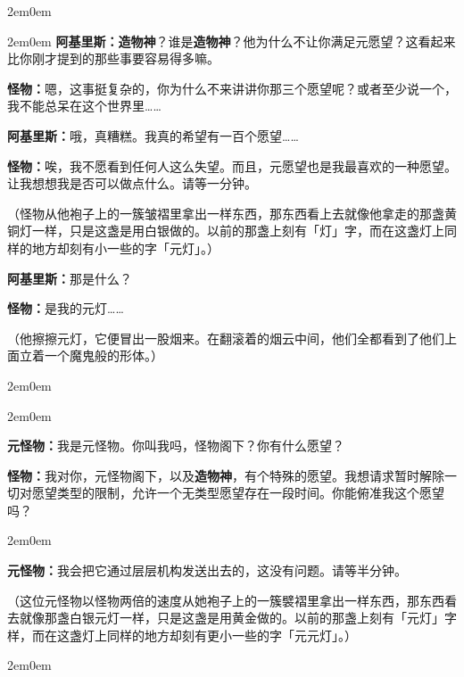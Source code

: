 \documentclass[
  12pt,
  twoside,
  openright,
  oldfontcommands,
]{memoir}
\newcommand{\heititext}[1]{{\heifamily\bfseries #1}}
\newcommand{\dialogname}[1]{{\heifamily\bfseries #1}}
\begin{document}
\begin{adjustwidth}{2em}{0em}
\begin{adjustwidth}{2em}{0em}
\dialogname{阿基里斯：}\heititext{造物神}？谁是\heititext{造物神}？他为什么不让你满足元愿望？这看起来比你刚才提到的那些事要容易得多嘛。

\dialogname{怪物：}嗯，这事挺复杂的，你为什么不来讲讲你那三个愿望呢？或者至少说一个，我不能总呆在这个世界里\ldots\ldots{}

\dialogname{阿基里斯：}哦，真糟糕。我真的希望有一百个愿望\ldots\ldots{}

\dialogname{怪物：}唉，我不愿看到任何人这么失望。而且，元愿望也是我最喜欢的一种愿望。让我想想我是否可以做点什么。请等一分钟。

\hfill\break

（怪物从他袍子上的一簇皱褶里拿出一样东西，那东西看上去就像他拿走的那盏黄铜灯一样，只是这盏是用白银做的。以前的那盏上刻有「灯」字，而在这盏灯上同样的地方却刻有小一些的字「元灯」。）

\dialogname{阿基里斯：}那是什么？

\dialogname{怪物：}是我的元灯\ldots\ldots{}

（他擦擦元灯，它便冒出一股烟来。在翻滚着的烟云中间，他们全都看到了他们上面立着一个魔鬼般的形体。）

\end{adjustwidth}

\begin{adjustwidth}{2em}{0em}

\begin{adjustwidth}{2em}{0em}

\dialogname{元怪物：}我是元怪物。你叫我吗，怪物阁下？你有什么愿望？

\end{adjustwidth}

\dialogname{怪物：}我对你，元怪物阁下，以及\heititext{造物神}，有个特殊的愿望。我想请求暂时解除一切对愿望类型的限制，允许一个无类型愿望存在一段时间。你能俯准我这个愿望吗？

\begin{adjustwidth}{2em}{0em}

\dialogname{元怪物：}我会把它通过层层机构发送出去的，这没有问题。请等半分钟。

（这位元怪物以怪物两倍的速度从她袍子上的一簇襞褶里拿出一样东西，那东西看去就像那盏白银元灯一样，只是这盏是用黄金做的。以前的那盏上刻有「元灯」字样，而在这盏灯上同样的地方却刻有更小一些的字「元元灯」。）

\end{adjustwidth}

\begin{adjustwidth}{2em}{0em}


\end{adjustwidth}
\end{adjustwidth}
\end{adjustwidth}
\end{document}

